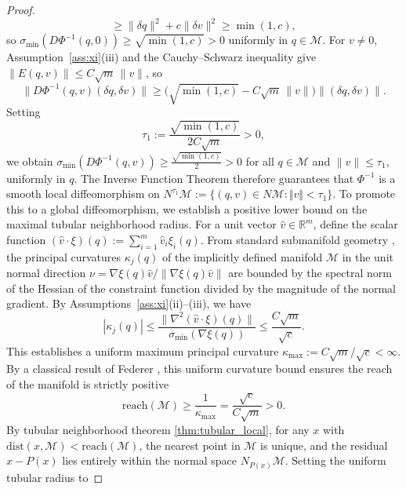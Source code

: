 \documentclass[12pt]{article}
\begin{document}
\begin{proof}
\begin{equation}
    \geq \|\delta q\|^2 + c\|\delta v\|^2
    \geq \min(1,c),
\end{equation}
so $\sigma_{\min}(D\Phi^{-1}(q,0)) \geq \sqrt{\min(1,c)} > 0$ uniformly in $q \in \mathcal{M}$.
For $v \neq 0$, Assumption~\ref{ass:xi}(iii) and the Cauchy--Schwarz inequality give
$\|E(q,v)\| \leq C\sqrt{m}\,\|v\|$, so
\begin{equation}\nonumber
    \|D\Phi^{-1}(q,v)(\delta q,\delta v)\|
    \geq \bigl(\sqrt{\min(1,c)} - C\sqrt{m}\,\|v\|\bigr)\|(\delta q,\delta v)\|.
\end{equation}
Setting
\begin{equation}\nonumber
    \tau_1 := \frac{\sqrt{\min(1,c)}}{2C\sqrt{m}} > 0,
\end{equation}
we obtain $\sigma_{\min}(D\Phi^{-1}(q,v)) \geq \frac{\sqrt{\min(1,c)}}{2} > 0$ for all
$q \in \mathcal{M}$ and $\|v\| \leq \tau_1$, uniformly in $q$. The Inverse Function Theorem
therefore guarantees that $\Phi^{-1}$ is a smooth local diffeomorphism on $N^{\tau_1}\mathcal{M}:=\{(q,v)\in N\mathcal{M}: \Vert v\Vert<\tau_1\}$.
To promote this to a global diffeomorphism, we establish a positive lower bound on the maximal tubular neighborhood radius. For a unit vector $\hat{v} \in \mathbb{R}^m$, define the scalar function $(\hat{v}\cdot\xi)(q) := \sum_{i=1}^m \hat{v}_i\xi_i(q)$. From standard submanifold geometry \citep[Chapter 8]{Lee2018}, the principal curvatures $\kappa_j(q)$ of the implicitly defined manifold $\mathcal{M}$ in the unit normal direction $\nu = \nabla\xi(q)\hat{v}/\|\nabla\xi(q)\hat{v}\|$ are bounded by the spectral norm of the Hessian of the constraint function divided by the magnitude of the normal gradient. By Assumptions~\ref{ass:xi}(ii)--(iii), we have
\begin{equation}\nonumber
    |\kappa_j(q)|
    \leq \frac{\|\nabla^2(\hat{v}\cdot\xi)(q)\|}{\sigma_{\min}(\nabla\xi(q))}
    \leq \frac{C\sqrt{m}}{\sqrt{c}}.
\end{equation}
This establishes a uniform maximum principal curvature $\kappa_{\max} := C\sqrt{m}/\sqrt{c} < \infty$. By a classical result of Federer \cite[Theorem~4.18]{Federer1959}, this uniform curvature bound ensures the reach of the manifold is strictly positive
\begin{equation}\nonumber
\mathrm{reach}(\mathcal{M}) \geq \frac{1}{\kappa_{\max}} = \frac{\sqrt{c}}{C\sqrt{m}} > 0.
\end{equation}
By tubular neighborhood theorem \ref{thm:tubular_local}, for any $x$ with $\mathrm{dist}(x, \mathcal{M}) < \mathrm{reach}(\mathcal{M})$, the nearest point in $\mathcal{M}$ is unique, and the residual $x - P(x)$ lies entirely within the normal space $N_{P(x)}\mathcal{M}$. Setting the uniform tubular radius to

\end{proof}
\end{document}
